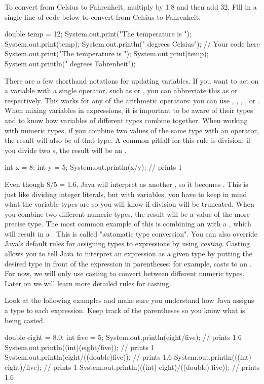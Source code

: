 \begin{exercise}	
  To convert from Celsius to Fahrenheit, multiply by 1.8 and then add 32. Fill in a single line of code below to convert  from Celsius to Fahrenheit;	
  \begin{code}	
    double temp = 12;	
    System.out.print("The temperature is ");	
    System.out.print(temp);	
    System.out.println(" degrees Celsius");	
    // Your code here	
    System.out.print("The temperature is ");	
    System.out.print(temp);	
    System.out.println(" degrees Fahrenheit");	
  \end{code}	
\end{exercise}	
There are a few shorthand notations for updating variables. If you want to act on a variable  with a single operator, such as  or , you can abbreviate this as  or  respectively. This works for any of the arithmetic operators: you can use \ic{+=}, \ic{-=}, \ic{*=}, \ic{/=}, or \ic{\%=}.	
When mixing variables in expressions, it is important to be aware of their types and to know how variables of different types combine together. When working with numeric types, if you combine two values of the same type with an operator, the result will also be of that type. A common pitfall for this rule is division: if you divide two s, the result will be an .	
\begin{code}	
  int x = 8;	
  int y = 5;	
  System.out.println(x/y); // prints 1	
\end{code}	
Even though 8/5 = 1.6, Java will interpret  as another , so it becomes . This is just like dividing integer literals, but with variables, you have to keep in mind what the variable types are so you will know if division will be truncated.	
When you combine two different numeric types, the result will be a value of the more precise type. The most common example of this is combining an  with a , which will result in a . This is called "automatic type conversion".
You can also override Java's default rules for assigning types to expressions by using \emph{casting}. Casting allows you to tell Java to interpret an expression as a given type by putting the desired type in front of the expression in parentheses: for example,  casts  to an . For now, we will only use casting to convert between different numeric types. Later on we will learn more detailed rules for casting.	
\begin{example}	
  Look at the following examples and make sure you understand how Java assigns a type to each expression. Keep track of the parentheses so you know what is being casted.	
  \begin{code}	
    double eight = 8.0;	
    int five = 5;	
    System.out.println(eight/five); // prints 1.6	
    System.out.println((int)(eight/five)); // prints 1	
    System.out.println(eight/((double)five)); // prints 1.6	
    System.out.println(((int) eight)/five); // prints 1	
    System.out.println(((int) eight)/((double) five)); // prints 1.6	
  \end{code}	
\end{example}	

